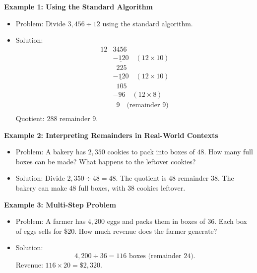 \documentclass[12pt]{article}
\begin{document}
\begin{tcolorbox}[colframe=black!60, colback=white, 
coltitle=black, colbacktitle=black!15, fonttitle=\bfseries\Large, 
title=Examples, halign title=center, left=10pt, right=10pt, top=10pt, bottom=15pt]
\textbf{Example 1: Using the Standard Algorithm}
\begin{itemize}
    \item Problem: Divide \( 3,456 \div 12 \) using the standard algorithm.
    \item Solution:
    \[
    \begin{array}{r|l}
        12 & 3456 \\
           & \underline{-120} \quad (12 \times 10) \\
           & \phantom{3}225 \\
           & \underline{-120} \quad (12 \times 10) \\
           & \phantom{3}105 \\
           & \underline{-96} \quad (12 \times 8) \\
           & \phantom{3}9 \quad \text{(remainder 9)} \\
    \end{array}
    \]
    Quotient: \( 288 \) remainder \( 9 \).
\end{itemize}

\textbf{Example 2: Interpreting Remainders in Real-World Contexts}
\begin{itemize}
    \item Problem: A bakery has \( 2,350 \) cookies to pack into boxes of \( 48 \). How many full boxes can be made? What happens to the leftover cookies?
    \item Solution: Divide \( 2,350 \div 48 = 48 \). The quotient is \( 48 \) remainder \( 38 \). The bakery can make \( 48 \) full boxes, with \( 38 \) cookies leftover.
\end{itemize}

\textbf{Example 3: Multi-Step Problem}
\begin{itemize}
    \item Problem: A farmer has \( 4,200 \) eggs and packs them in boxes of \( 36 \). Each box of eggs sells for \$20. How much revenue does the farmer generate?
    \item Solution:
    \[
    4,200 \div 36 = 116 \text{ boxes (remainder 24).}
    \]
    Revenue: \( 116 \times 20 = \$2,320 \).
\end{itemize}
\end{tcolorbox}
\end{document}
